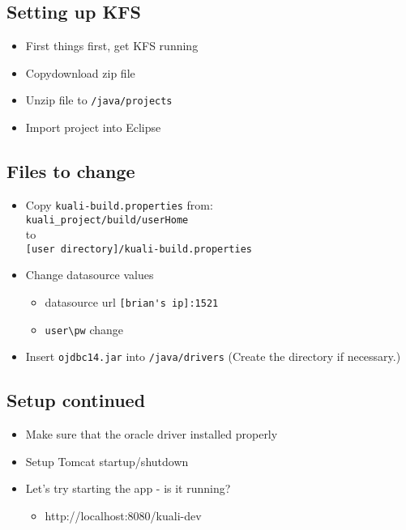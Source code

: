 \begin{ifhtml}
  \begin{s5slide}
    \section{Setting up KFS}
    \begin{itemize}
      \item First things first, get KFS running
      \item Copy\/download zip file
      \item Unzip file to \verb|/java/projects|
      \item Import project into Eclipse
    \end{itemize}
  \end{s5slide}
  \begin{s5slide}
      \section{Files to change}
          \begin{itemize}
            \item Copy \verb|kuali-build.properties| from: \\
                    \verb|kuali_project/build/userHome|  \\
                    to \\
                    \verb|[user directory]/kuali-build.properties| \\
            \item Change datasource values
              \begin{itemize}
                \item datasource url \- \verb|[brian's ip]:1521|
                \item \verb|user\pw| change
              \end{itemize}
            \item Insert \verb|ojdbc14.jar| into \verb|/java/drivers| (Create the directory if necessary.)
          \end{itemize}
  \end{s5slide}
  \begin{s5slide}
    \section{Setup continued}
    \begin{itemize}
      \item Make sure that the oracle driver installed properly
      \item Setup Tomcat startup/shutdown
      \item Let's try starting the app - is it running?
        \begin{itemize}
          \item http://localhost:8080/kuali-dev
        \end{itemize}
    \end{itemize}
  \end{s5slide}
\end{ifhtml}
